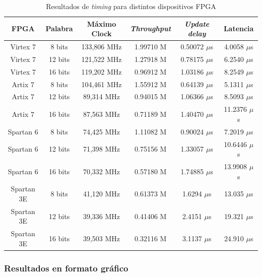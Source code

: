 \begin{table}[htb!]
    \begin{center}
      \small
        \begin{tabular}{|c|c|c|c|c|c|}
        \hline  
        \textbf{FPGA} & \textbf{Palabra} & \textbf{Máximo Clock} & \textbf{\textit{Throughput}} & \textbf{\textit{Update delay}} & \textbf{Latencia}\\
        \hline
        \hline
        Virtex 7   & 8 bits  & 133,806 MHz & 1.99710 M & 0.50072 $\mu$s & 4.0058  $\mu$s \\ \hline
        Virtex 7   & 12 bits & 121,522 MHz & 1.27918 M & 0.78175 $\mu$s & 6.2540  $\mu$s \\ \hline
        Virtex 7   & 16 bits & 119,202 MHz & 0.96912 M & 1.03186 $\mu$s & 8.2549  $\mu$s \\ \hline
        Artix 7    & 8 bits  & 104,461 MHz & 1.55912 M & 0.64139 $\mu$s & 5.1311  $\mu$s \\ \hline
        Artix 7    & 12 bits & 89,314 MHz  & 0.94015 M & 1.06366 $\mu$s & 8.5093  $\mu$s \\ \hline
        Artix 7    & 16 bits & 87,563 MHz  & 0.71189 M & 1.40470 $\mu$s & 11.2376 $\mu$s \\ \hline
        Spartan 6  & 8 bits  & 74,425 MHz  & 1.11082 M & 0.90024 $\mu$s & 7.2019  $\mu$s \\ \hline
        Spartan 6  & 12 bits & 71,398 MHz  & 0.75156 M & 1.33057 $\mu$s & 10.6446 $\mu$s \\ \hline
        Spartan 6  & 16 bits & 70,332 MHz  & 0.57180 M & 1.74885 $\mu$s & 13.9908 $\mu$s \\ \hline
        Spartan 3E & 8 bits  & 41,120 MHz  & 0.61373 M & 1.6294  $\mu$s & 13.035  $\mu$s \\ \hline
        Spartan 3E & 12 bits & 39,336 MHz  & 0.41406 M & 2.4151  $\mu$s & 19.321  $\mu$s \\ \hline
        Spartan 3E & 16 bits & 39,503 MHz  & 0.32116 M & 3.1137  $\mu$s & 24.910  $\mu$s \\ \hline
        \end{tabular}
        \caption{Resultados de \textit{timing} para distintos dispositivos FPGA}
      \normalsize
    \end{center}
\end{table}

\newpage

\subsubsection{Resultados en formato gráfico}


